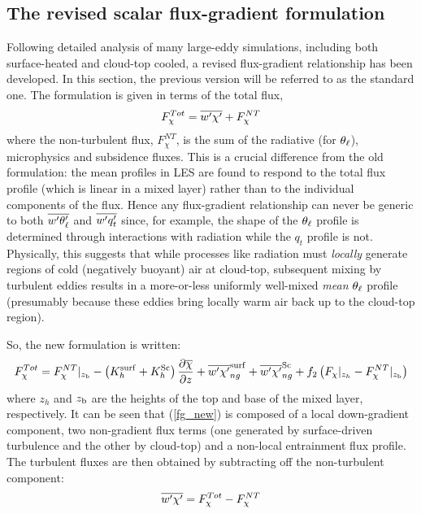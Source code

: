 \documentclass{UMDP_article}
\begin{document}
\subsection{The revised scalar flux-gradient formulation}
\label{sec:rev_flux_grad}

Following detailed analysis of many large-eddy simulations, including
both surface-heated and cloud-top cooled, a revised flux-gradient
relationship has been developed.  In this section, the previous
version will be referred to as the standard one.  The formulation is
given in terms of the total flux,
\begin{equation*}
  F_{\chi}^{Tot}=\overline{w'\chi'} + F_{\chi}^{NT}
\end{equation*}
where the non-turbulent flux, $F_{\chi}^{NT}$, is the sum of the
radiative (for $\theta_{\ell}$), microphysics and subsidence fluxes.  This
is a crucial difference from the old formulation: the mean profiles in
LES are found to respond to the total flux profile (which is linear in
a mixed layer) rather than to the individual components of the flux.
Hence any flux-gradient relationship can never be generic to both
$\overline{w'\theta_{\ell}'}$ and $\overline{w'q_t'}$ since, for example, the shape of the $\theta_{\ell}$
profile is determined through interactions with radiation while the
$q_t$ profile is not.  Physically, this suggests that while processes
like radiation must {\em locally} generate regions of cold (negatively
buoyant) air at cloud-top, subsequent mixing by turbulent eddies
results in a more-or-less uniformly well-mixed {\em mean} $\theta_{\ell}$
profile (presumably because these eddies bring locally warm air back
up to the cloud-top region).

So, the new formulation is written: 
\begin{equation}
  F_{\chi}^{Tot} = F_{\chi}^{NT}|_{z_{\rm b}} 
  -\left( K_h^{\rm surf} + K_h^{\rm Sc} \right) \frac{\partial \overline{\chi}}{\partial z} 
  + \overline{w'\chi'}_{ng}^{\rm surf} + \overline{w'\chi'}_{ng}^{\rm Sc} 
  + f_2 \left( F_{\chi}|_{z_h} - F_{\chi}^{NT}|_{z_{\rm b}} \right)
\label{fg_new}
\end{equation}
where $z_h$ and $z_{\rm b}$ are the heights of the top and base of the
mixed layer, respectively.  It can be seen that (\ref{fg_new}) is
composed of a local down-gradient component, two non-gradient flux
terms (one generated by surface-driven turbulence and the other by
cloud-top) and a non-local entrainment flux profile.  The turbulent
fluxes are then obtained by subtracting off the non-turbulent
component:
\begin{equation*}
  \overline{w'\chi'} = F_{\chi}^{Tot} - F_{\chi}^{NT}
\end{equation*}
\end{document}
